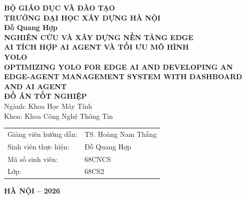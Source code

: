 \begin{titlepage}
\begin{center}
{\large\bfseries BỘ GIÁO DỤC VÀ ĐÀO TẠO}\\[2pt]
{\large\bfseries TRƯỜNG ĐẠI HỌC XÂY DỰNG HÀ NỘI}\\[2.5cm]
{\large\bfseries Đỗ Quang Hợp}\\[1.5cm]
{\LARGE\bfseries NGHIÊN CỨU VÀ XÂY DỰNG NỀN TẢNG EDGE\\[4pt]
AI TÍCH HỢP AI AGENT VÀ TỐI ƯU MÔ HÌNH\\[4pt] YOLO}\\[1cm]
{\large\bfseries OPTIMIZING YOLO FOR EDGE AI AND DEVELOPING AN EDGE-AGENT
MANAGEMENT SYSTEM WITH DASHBOARD AND AI AGENT}\\[1.5cm]
{\Large\bfseries ĐỒ ÁN TỐT NGHIỆP}\\[1cm]
{\large Ngành: Khoa Học Máy Tính}\\[2pt]
{\large Khoa: Khoa Công Nghệ Thông Tin}\\[1.5cm]
\begin{tabular}{ll}
Giảng viên hướng dẫn: & TS. Hoàng Nam Thắng\\[6pt]
Sinh viên thực hiện:  & Đỗ Quang Hợp\\[6pt]
Mã số sinh viên:      & 68CNCS\\[6pt]
Lớp:                  & 68CS2
\end{tabular}
\vfill
{\large\bfseries HÀ NỘI -- 2026}
\end{center}
\end{titlepage}
